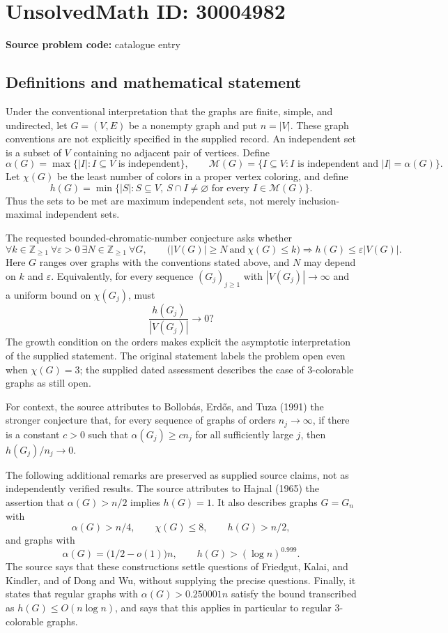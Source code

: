 \documentclass[11pt]{article}
\newcommand{\Z}{\mathbb{Z}}
\begin{document}
\section*{UnsolvedMath ID: 30004982}
\textbf{Source problem code:} catalogue entry
\subsection{Definitions and mathematical statement}
Under the conventional interpretation that the graphs are finite, simple, and undirected, let \(G=(V,E)\) be a nonempty graph and put \(n=|V|\). These graph conventions are not explicitly specified in the supplied record. An independent set is a subset of \(V\) containing no adjacent pair of vertices. Define
\[
\alpha(G)=\max\{|I|:I\subseteq V\text{ is independent}\},
\qquad
\mathcal M(G)=\{I\subseteq V:I\text{ is independent and }|I|=\alpha(G)\}.
\]
Let \(\chi(G)\) be the least number of colors in a proper vertex coloring, and define
\[
h(G)=\min\bigl\{|S|:S\subseteq V,\ S\cap I\ne\varnothing\text{ for every }I\in\mathcal M(G)\bigr\}.
\]
Thus the sets to be met are maximum independent sets, not merely inclusion-maximal independent sets.

The requested bounded-chromatic-number conjecture asks whether
\[
\forall k\in\Z_{\ge1}\ \forall\varepsilon>0\ \exists N\in\Z_{\ge1}\ \forall G,
\qquad
\bigl(|V(G)|\ge N\ \text{and}\ \chi(G)\le k\bigr)
\Longrightarrow h(G)\le\varepsilon |V(G)|.
\]
Here \(G\) ranges over graphs with the conventions stated above, and \(N\) may depend on \(k\) and \(\varepsilon\). Equivalently, for every sequence \((G_j)_{j\ge1}\) with \(|V(G_j)|\to\infty\) and a uniform bound on \(\chi(G_j)\), must
\[
\frac{h(G_j)}{|V(G_j)|}\longrightarrow0?
\]
The growth condition on the orders makes explicit the asymptotic interpretation of the supplied statement. The original statement labels the problem open even when \(\chi(G)=3\); the supplied dated assessment describes the case of \(3\)-colorable graphs as still open.

For context, the source attributes to Bollob\'as, Erd\H{o}s, and Tuza (1991) the stronger conjecture that, for every sequence of graphs of orders \(n_j\to\infty\), if there is a constant \(c>0\) such that \(\alpha(G_j)\ge c n_j\) for all sufficiently large \(j\), then \(h(G_j)/n_j\to0\).

The following additional remarks are preserved as supplied source claims, not as independently verified results. The source attributes to Hajnal (1965) the assertion that \(\alpha(G)>n/2\) implies \(h(G)=1\). It also describes graphs \(G=G_n\) with
\[
\alpha(G)>n/4,\qquad \chi(G)\le8,\qquad h(G)>n/2,
\]
and graphs with
\[
\alpha(G)=\bigl(1/2-o(1)\bigr)n,
\qquad h(G)>(\log n)^{0.999}.
\]
The source says that these constructions settle questions of Friedgut, Kalai, and Kindler, and of Dong and Wu, without supplying the precise questions. Finally, it states that regular graphs with \(\alpha(G)>0.250001n\) satisfy the bound transcribed as \(h(G)\le O(n\log n)\), and says that this applies in particular to regular \(3\)-colorable graphs.
\end{document}
